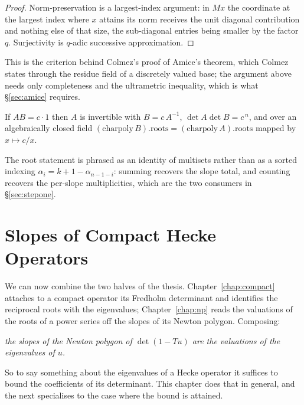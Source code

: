 \begin{proof}
  \leanok
  Norm-preservation is a largest-index argument: in $Mx$ the coordinate at the largest index
  where $x$ attains its norm receives the unit diagonal contribution and nothing else of that
  size, the sub-diagonal entries being smaller by the factor $q$.  Surjectivity is $q$-adic
  successive approximation.
\end{proof}

This is the criterion behind Colmez's proof of Amice's theorem, which Colmez states through the
residue field of a discretely valued base; the argument above needs only completeness and the
ultrametric inequality, which is what \S\ref{sec:amice} requires.

\begin{lemma}
  \label{lem:charpoly-pairing}
  \leanok
  If $AB = c\cdot 1$ then $A$ is invertible with $B = c\,A^{-1}$, $\det A\det B = c^{\,n}$, and
  over an algebraically closed field
  $(\mathrm{charpoly}\,B).\mathrm{roots} = (\mathrm{charpoly}\,A).\mathrm{roots}$ mapped by
  $x \mapsto c/x$.
\end{lemma}

The root statement is phrased as an identity of multisets rather than as a sorted indexing
$\alpha_i = k+1-\alpha_{n-1-i}$: summing recovers the slope total, and counting recovers the
per-slope multiplicities, which are the two consumers in \S\ref{sec:stepone}.


\chapter{Slopes of Compact Hecke Operators}
\label{chap:slopes}

We can now combine the two halves of the thesis.  Chapter~\ref{chap:compact} attaches to a
compact operator its Fredholm determinant and identifies the reciprocal roots with the
eigenvalues; Chapter~\ref{chap:np} reads the valuations of the roots of a power series off the
slopes of its Newton polygon.  Composing:

\begin{center}
  \emph{the slopes of the Newton polygon of $\det(1 - Tu)$ are the valuations of the eigenvalues
  of $u$.}
\end{center}

So to say something about the eigenvalues of a Hecke operator it suffices to bound the
coefficients of its determinant.  This chapter does that in general, and the next specialises to
the case where the bound is attained.

